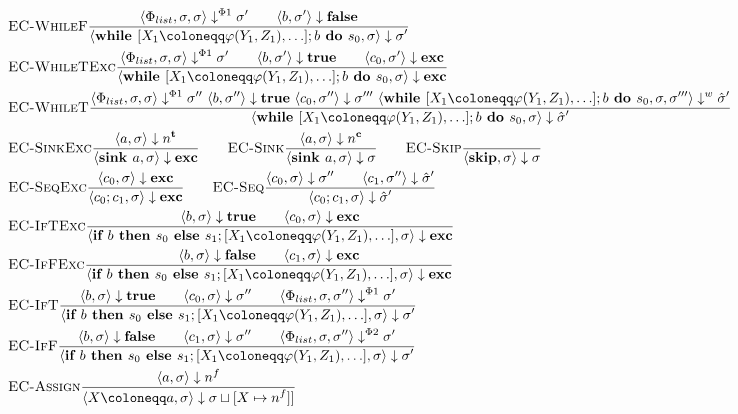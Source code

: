 \begin{align*}
    &\bsrule{EC-WhileF}{\bigsteppl{\philist}{\store}{\store}{\store'} \qquad
        \bigstep{b}{\sigma'}{\bfalse}}
    {\bigstep{\defaultssawhile}{\store}{\store'}}\\
    &\bsrule{EC-WhileTExc}{\bigsteppl{\philist}{\store}{\store}{\store'} \qquad
    \bigstep{b}{\store'}{\btrue} \qquad 
    \bigstep{c_0}{\store'}{\exception}}
    {\bigstep{\defaultssawhile}{\sigma}{\exception}}\\
    &\bsrule{EC-WhileT}{\bigsteppl{\philist}{\store}{\store}{\store''} \ 
        \bigstep{b}{\store''}{\btrue} \ 
    \bigstep{c_0}{\store''}{\store'''} \ 
    \bigstepw{\defaultssawhile}{\store}{\store'''}{\excstore'}}
    {\bigstep{\defaultssawhile}{\store}{\excstore'}}\\
    &\bsrule{EC-SinkExc}{\bigstep{a}{\store}{\tracked{}}}
    {\bigstep{\defaultsink}{\store}{\exception}} \qquad
    \bsrule{EC-Sink}{\bigstep{a}{\store}{\clean{}}}
    {\bigstep{\defaultsink}{\store}{\store}} \qquad
    \bsrule{EC-Skip}{}{\bigstep{\skipcmd}{\store}{\store}}\\
    &\bsrule{EC-SeqExc}{\bigstep{c_0}{\sigma}{\exception}}
    {\bigstep{\defaultseq}{\store}{\exception}} \qquad
    \bsrule{EC-Seq}{\bigstep{c_0}{\sigma}{\store''} \qquad \bigstep{c_1}{\store''}{\excstore'}}
    {\bigstep{\defaultseq}{\store}{\excstore'}}\\
    &\bsrule{EC-IfTExc}{\bigstep{b}{\store}{\btrue}\qquad \bigstep{c_0}{\store}{\exception}}
    {\bigstep{\defaultssaif}{\store}{\exception}}\\
    &\bsrule{EC-IfFExc}{\bigstep{b}{\store}{\bfalse}\qquad \bigstep{c_1}{\store}{\exception}}
    {\bigstep{\defaultssaif}{\store}{\exception}}\\
    &\bsrule{EC-IfT}{\bigstep{b}{\store}{\btrue}\qquad \bigstep{c_0}{\store}{\store''}
    \qquad \bigsteppl{\philist}{\sigma}{\sigma''}{\sigma'}}
    {\bigstep{\defaultssaif}{\store}{\store'}}\\
    &\bsrule{EC-IfF}{\bigstep{b}{\store}{\bfalse}\qquad \bigstep{c_1}{\store}{\store''}
    \qquad \bigsteppr{\philist}{\sigma}{\sigma''}{\sigma'}}
    {\bigstep{\defaultssaif}{\store}{\store'}}\\
    &\bsrule{EC-Assign}{\bigstep{a}{\store}{\flagged{}}}
    {\bigstep{\defaultstore}{\store}{\storeassign{\store}{X \mapsto \flagged{}]}}}\\
\end{align*}

